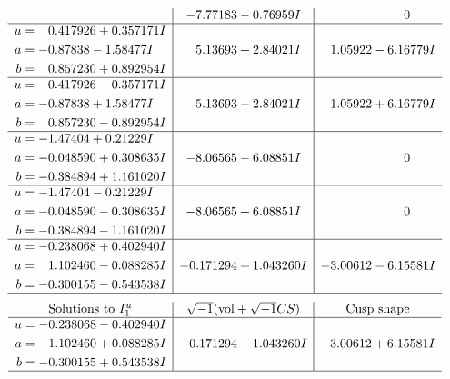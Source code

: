 \documentclass[1p]{elsarticle_modified}
\theoremstyle{definition}
\newcommand{\I}{\sqrt{-1}}
\begin{document}
$$\begin{array}{c|c|c}
 & -7.77183 - 0.76959 I & \phantom{-0.000000 } 0 \\ \hline\begin{aligned}
u &= \phantom{-}0.417926 + 0.357171 I \\
a &= -0.87838 - 1.58477 I \\
b &= \phantom{-}0.857230 + 0.892954 I\end{aligned}
 & \phantom{-}5.13693 + 2.84021 I & \phantom{-}1.05922 - 6.16779 I \\ \hline\begin{aligned}
u &= \phantom{-}0.417926 - 0.357171 I \\
a &= -0.87838 + 1.58477 I \\
b &= \phantom{-}0.857230 - 0.892954 I\end{aligned}
 & \phantom{-}5.13693 - 2.84021 I & \phantom{-}1.05922 + 6.16779 I \\ \hline\begin{aligned}
u &= -1.47404 + 0.21229 I \\
a &= -0.048590 + 0.308635 I \\
b &= -0.384894 + 1.161020 I\end{aligned}
 & -8.06565 - 6.08851 I & \phantom{-0.000000 } 0 \\ \hline\begin{aligned}
u &= -1.47404 - 0.21229 I \\
a &= -0.048590 - 0.308635 I \\
b &= -0.384894 - 1.161020 I\end{aligned}
 & -8.06565 + 6.08851 I & \phantom{-0.000000 } 0 \\ \hline\begin{aligned}
u &= -0.238068 + 0.402940 I \\
a &= \phantom{-}1.102460 - 0.088285 I \\
b &= -0.300155 - 0.543538 I\end{aligned}
 & -0.171294 + 1.043260 I & -3.00612 - 6.15581 I\\
 \hline 
 \end{array}$$\newpage$$\begin{array}{c|c|c}  
\text{Solutions to }I^u_{1}& \I (\text{vol} + \sqrt{-1}CS) & \text{Cusp shape}\\
 \hline 
\begin{aligned}
u &= -0.238068 - 0.402940 I \\
a &= \phantom{-}1.102460 + 0.088285 I \\
b &= -0.300155 + 0.543538 I\end{aligned}
 & -0.171294 - 1.043260 I & -3.00612 + 6.15581 I\\
 \hline 
 \end{array}$$\newpage\newpage\renewcommand{\arraystretch}{1}
\end{document}
